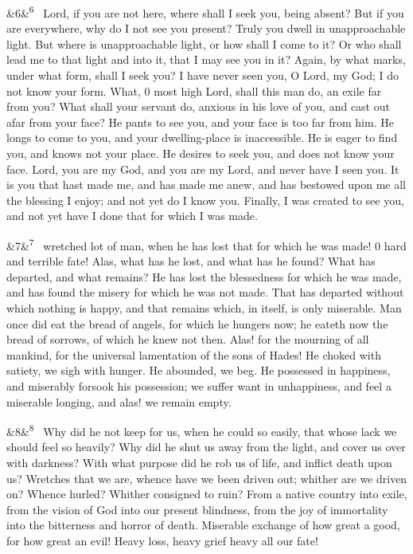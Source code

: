 \documentclass[12pt]{article}
\newcommand{\para}[1][]{\par\noindent\ifx&#1&\else\textsuperscript{\footnotesize #1}~\fi}
\begin{document}
\para[6] Lord, if you are not here, where shall I seek you, being absent? But if you are everywhere, why do I not see you present? Truly you dwell in unapproachable light. But where is unapproachable light, or how shall I come to it? Or who shall lead me to that light and into it, that I may see you in it? Again, by what marks, under what form, shall I seek you? I have never seen you, O Lord, my God; I do not know your form. What, 0 most high Lord, shall this man do, an exile far from you? What shall your servant do, anxious in his love of you, and cast out afar from your face? He pants to see you, and your face is too far from him. He longs to come to you, and your dwelling-place is inaccessible. He is eager to find you, and knows not your place. He desires to seek you, and does not know your face. Lord, you are my God, and you are my Lord, and never have I seen you. It is you that hast made me, and has made me anew, and has bestowed upon me all the blessing I enjoy; and not yet do I know you. Finally, I was created to see you, and not yet have I done that for which I was made.

\para[7] 0 wretched lot of man, when he has lost that for which he was made! 0 hard and terrible fate! Alas, what has he lost, and what has he found? What has departed, and what remains? He has lost the blessedness for which he was made, and has found the misery for which he was not made. That has departed without which nothing is happy, and that remains which, in itself, is only miserable. Man once did eat the bread of angels, for which he hungers now; he eateth now the bread of sorrows, of which he knew not then. Alas! for the mourning of all mankind, for the universal lamentation of the sons of Hades! He choked with satiety, we sigh with hunger. He abounded, we beg. He possessed in happiness, and miserably forsook his possession; we suffer want in unhappiness, and feel a miserable longing, and alas! we remain empty.

\para[8] Why did he not keep for us, when he could so easily, that whose lack we should feel so heavily? Why did he shut us away from the light, and cover us over with darkness? With what purpose did he rob us of life, and inflict death upon us? Wretches that we are, whence have we been driven out; whither are we driven on? Whence hurled? Whither consigned to ruin? From a native country into exile, from the vision of God into our present blindness, from the joy of immortality into the bitterness and horror of death. Miserable exchange of how great a good, for how great an evil! Heavy loss, heavy grief heavy all our fate!
\end{document}
